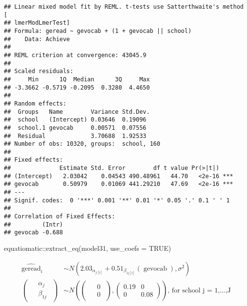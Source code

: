 \documentclass[
]{book}
\newenvironment{Shaded}{\begin{snugshade}}{\end{snugshade}}
\newcommand{\AttributeTok}[1]{\textcolor[rgb]{0.77,0.63,0.00}{#1}}
\newcommand{\ConstantTok}[1]{\textcolor[rgb]{0.00,0.00,0.00}{#1}}
\newcommand{\FunctionTok}[1]{\textcolor[rgb]{0.00,0.00,0.00}{#1}}
\newcommand{\NormalTok}[1]{#1}
\newcommand{\SpecialCharTok}[1]{\textcolor[rgb]{0.00,0.00,0.00}{#1}}
\begin{document}
\begin{verbatim}
## Linear mixed model fit by REML. t-tests use Satterthwaite's method [
## lmerModLmerTest]
## Formula: geread ~ gevocab + (1 + gevocab || school)
##    Data: Achieve
## 
## REML criterion at convergence: 43045.9
## 
## Scaled residuals: 
##     Min      1Q  Median      3Q     Max 
## -3.3662 -0.5719 -0.2095  0.3280  4.4650 
## 
## Random effects:
##  Groups   Name        Variance Std.Dev.
##  school   (Intercept) 0.03646  0.19096 
##  school.1 gevocab     0.00571  0.07556 
##  Residual             3.70688  1.92533 
## Number of obs: 10320, groups:  school, 160
## 
## Fixed effects:
##              Estimate Std. Error        df t value Pr(>|t|)    
## (Intercept)   2.03042    0.04543 490.48961   44.70   <2e-16 ***
## gevocab       0.50979    0.01069 441.29210   47.69   <2e-16 ***
## ---
## Signif. codes:  0 '***' 0.001 '**' 0.01 '*' 0.05 '.' 0.1 ' ' 1
## 
## Correlation of Fixed Effects:
##         (Intr)
## gevocab -0.688
\end{verbatim}

\begin{Shaded}
\begin{Highlighting}[]
\NormalTok{equatiomatic}\SpecialCharTok{::}\FunctionTok{extract\_eq}\NormalTok{(model31, }\AttributeTok{use\_coefs =} \ConstantTok{TRUE}\NormalTok{)}
\end{Highlighting}
\end{Shaded}

\[
\begin{aligned}
  \operatorname{\widehat{geread}}_{i}  &\sim N \left(2.03_{\alpha_{j[i]}} + 0.51_{\beta_{1j[i]}}(\operatorname{gevocab}), \sigma^2 \right) \\    
\left(
  \begin{array}{c} 
    \begin{aligned}
      &\alpha_{j} \\
      &\beta_{1j}
    \end{aligned}
  \end{array}
\right)
  &\sim N \left(
\left(
  \begin{array}{c} 
    \begin{aligned}
      &0 \\
      &0
    \end{aligned}
  \end{array}
\right)
, 
\left(
  \begin{array}{cc}
     0.19 & 0 \\ 
     0 & 0.08
  \end{array}
\right)
 \right)
    \text{, for school j = 1,} \dots \text{,J}
\end{aligned}
\]
\end{document}
